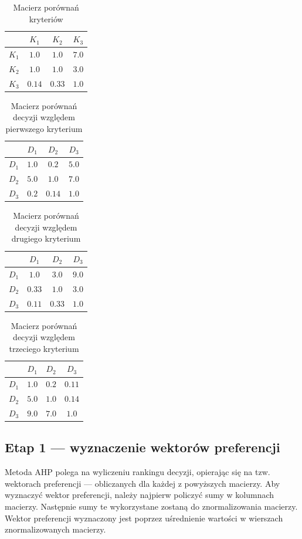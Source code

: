 \documentclass[a4paper,notitlepage]{article}
\begin{document}
\begin{table}[!ht]
\centering
\caption{Macierz porównań kryteriów}
	\begin{tabular}{c|c|c|c}
		&	$K_1$	&	$K_2$	&	$K_3$\\ \hline
	$K_1$	&	$1.0$	&	$1.0$	&	$7.0$\\ \hline
	$K_2$	&	$1.0$	&	$1.0$	&	$3.0$\\ \hline
	$K_3$	&	$0.14$	&	$0.33$	&	$1.0$
	\end{tabular}
\end{table}
\begin{table}[!ht]
\centering
\caption{Macierz porównań decyzji względem pierwszego kryterium}
	\begin{tabular}{c|c|c|c}
		&	$D_1$	&	$D_2$	&	$D_3$\\ \hline
	$D_1$	&	$1.0$	&	$0.2$	&	$5.0$\\ \hline
	$D_2$	&	$5.0$	&	$1.0$	&	$7.0$\\ \hline
	$D_3$	&	$0.2$	&	$0.14$	&	$1.0$
	\end{tabular}
\end{table}
\begin{table}[!ht]
\centering
\caption{Macierz porównań decyzji względem drugiego kryterium}
	\begin{tabular}{c|c|c|c}
		&	$D_1$	&	$D_2$	&	$D_3$\\ \hline
	$D_1$	&	$1.0$	&	$3.0$	&	$9.0$\\ \hline
	$D_2$	&	$0.33$	&	$1.0$	&	$3.0$\\ \hline
	$D_3$	&	$0.11$	&	$0.33$	&	$1.0$
	\end{tabular}
\end{table}
\begin{table}[!ht]
\centering
\caption{Macierz porównań decyzji względem trzeciego kryterium}
	\begin{tabular}{c|c|c|c}
		&	$D_1$	&	$D_2$	&	$D_3$\\ \hline
	$D_1$	&	$1.0$	&	$0.2$	&	$0.11$\\ \hline
	$D_2$	&	$5.0$	&	$1.0$	&	$0.14$\\ \hline
	$D_3$	&	$9.0$	&	$7.0$	&	$1.0$
	\end{tabular}
\end{table}

\pagebreak
\subsection{Etap 1 --- wyznaczenie wektorów preferencji}
Metoda AHP polega na wyliczeniu rankingu decyzji, opierając się na tzw. wektorach preferencji --- obliczanych dla każdej z powyższych macierzy.
Aby wyznaczyć wektor preferencji, należy najpierw policzyć sumy w kolumnach macierzy. Następnie sumy te wykorzystane zostaną do znormalizowania macierzy.
Wektor preferencji wyznaczony jest poprzez uśrednienie wartości w wierszach znormalizowanych macierzy.
\end{document}
